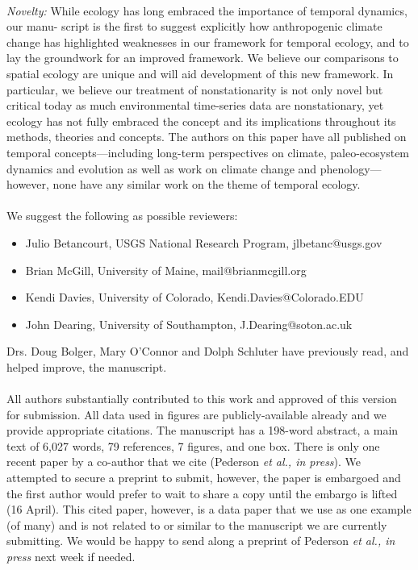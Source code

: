 \documentclass[11pt,a4paper]{letter}
\begin{document}
\begin{letter}{}
\vspace{-1ex}\\
\emph{Novelty:} While ecology has long embraced the importance of temporal dynamics, our manu- script is the first to suggest explicitly how anthropogenic climate change has highlighted weaknesses in our framework for temporal ecology, and to lay the groundwork for an improved framework. We believe our comparisons to spatial ecology are unique and will aid development of this new framework. In particular, we believe our treatment of nonstationarity is not only novel but critical today as much environmental time-series data are nonstationary, yet ecology has not fully embraced the concept and its implications throughout its methods, theories and concepts. The authors on this paper have all published on temporal concepts---including long-term perspectives on climate, paleo-ecosystem dynamics and evolution as well as work on climate change and phenology---however, none have any similar work on the theme of temporal ecology.
\\
\vspace{-1ex}\\
We suggest the following as possible reviewers:
\begin{itemize}
\item Julio Betancourt, USGS National Research Program, jlbetanc@usgs.gov
\item Brian McGill, University of Maine, mail@brianmcgill.org
\item Kendi Davies, University of Colorado, Kendi.Davies@Colorado.EDU
\item John Dearing, University of Southampton, J.Dearing@soton.ac.uk
\end{itemize}
Drs. Doug Bolger, Mary O'Connor and Dolph Schluter have previously read, and helped improve, the manuscript. 
\\
\vspace{-1ex}\\
All authors substantially contributed to this work and approved of this version for submission. All data used in figures are publicly-available already and we provide appropriate citations. The manuscript has a 198-word abstract, a main text of 6,027 words, 79 references, 7 figures, and one box. There is only one recent paper by a co-author that we cite (Pederson \emph{et al., in press}). We attempted to secure a preprint to submit, however, the paper is embargoed and the first author would prefer to wait to share a copy until the embargo is lifted (16 April). This cited paper, however, is a data paper that we use as one example (of many) and is not related to or similar to the manuscript we are currently submitting. We would be happy to send along a preprint of Pederson \emph{et al., in press} next week if needed. 

\end{letter}
\end{document}
